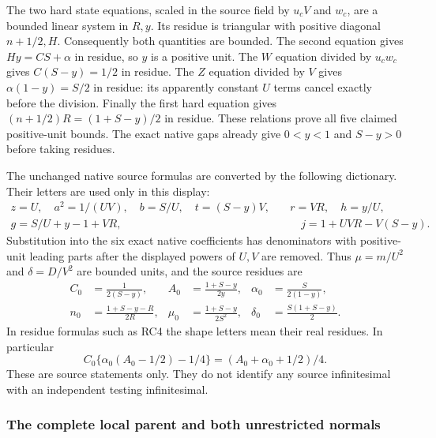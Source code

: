 The two hard state equations, scaled in the source field by
$u_cV$ and $w_c$, are a bounded linear system in $R,y$. Its
residue is triangular with positive diagonal $n+1/2,H$.
Consequently both quantities are bounded. The second equation gives
$Hy=CS+\alpha$ in residue, so $y$ is a positive unit. The
$W$ equation divided by $u_cw_c$ gives
$C(S-y)=1/2$ in residue. The $Z$ equation divided by $V$
gives $\alpha(1-y)=S/2$ in residue: its apparently constant
$U$ terms cancel exactly before the division. Finally the first
hard equation gives $(n+1/2)R=(1+S-y)/2$ in residue. These
relations prove all five claimed positive-unit bounds. The exact
native gaps already give $0<y<1$ and $S-y>0$ before taking
residues.

The unchanged native source formulas are converted by the following
dictionary. Their letters are used only in this display:
\[
\begin{aligned}
 z=U,\quad a^2=1/(UV),\quad b=S/U,\quad t=(S-y)V,
 &\quad r=VR,\quad h=y/U,\\
 g=S/U+y-1+VR,&\qquad j=1+UVR-V(S-y).
\end{aligned}
 \tag{RC3}
\]
Substitution into the six exact native coefficients has denominators
with positive-unit leading parts after the displayed powers of
$U,V$ are removed. Thus $\mu=m/U^2$ and $\delta=D/V^2$
are bounded units, and the source residues are
\[
\begin{aligned}
 C_0&=\frac1{2(S-y)},& A_0&=\frac{1+S-y}{2y},&
 \alpha_0&=\frac{S}{2(1-y)},\\
 n_0&=\frac{1+S-y-R}{2R},&
 \mu_0&=\frac{1+S-y}{2S^2},&
 \delta_0&=\frac{S(1+S-y)}2.
\end{aligned}\tag{RC4}
\]
In residue formulas such as RC4 the shape letters mean their real
residues. In particular
\[
 C_0\{\alpha_0(A_0-1/2)-1/4\}
       =(A_0+\alpha_0+1/2)/4.
 \tag{RC5}
\]
These are source statements only. They do not identify any source
infinitesimal with an independent testing infinitesimal.

\subsubsection*{The complete local parent and both unrestricted normals}

